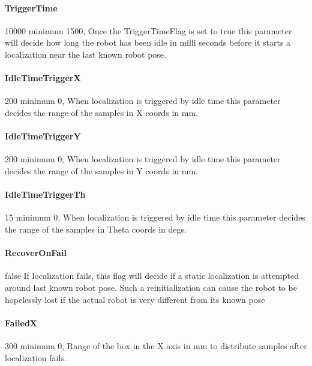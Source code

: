 \documentclass{article}
\begin{document}
\paragraph{TriggerTime} 10000         minimum 1500,  Once the TriggerTimeFlag is set to
                          true this parameter will decide how long the robot
                          has been idle in milli seconds before it starts a
                          localization near the last known robot pose.

\paragraph{IdleTimeTriggerX} 200      minimum 0,  When localization is triggered by idle
                          time this parameter decides the range of the samples
                          in X coords in mm.

\paragraph{IdleTimeTriggerY} 200      minimum 0,  When localization is triggered by idle
                          time this parameter decides the range of the samples
                          in Y coords in mm.

\paragraph{IdleTimeTriggerTh} 15      minimum 0,  When localization is triggered by idle
                          time this parameter decides the range of the samples
                          in Theta coords in degs.

\paragraph{RecoverOnFail} false       If localization fails, this flag will decide if a
                          static localization is attempted around last known
                          robot pose. Such a reinitialization can cause the
                          robot to be hopelessly lost if the actual robot is
                          very different from its known pose

\paragraph{FailedX} 300               minimum 0,  Range of the box in the X axis in mm to
                          distribute samples after localization fails.
\end{document}
